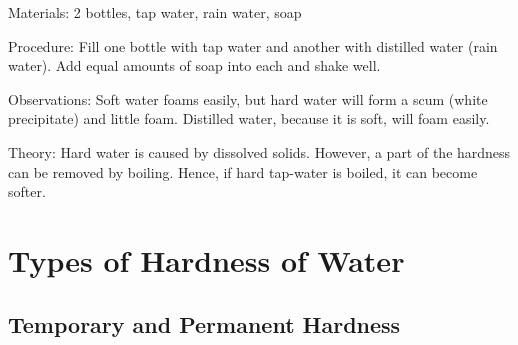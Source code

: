 \begin{multicols}{2}
\begin{description*}
\item[Materials:]{2 bottles, tap water, rain water, soap}
\item[Procedure:]{Fill one bottle with tap water and another with distilled water (rain water). Add equal amounts of soap into each and shake well. }
\item[Observations:]{Soft water foams easily, but hard
water will form a scum (white precipitate) and
little foam. Distilled water, because it is soft,
will foam easily.}
\item[Theory:]{Hard water is caused by dissolved solids.
However, a part of the hardness can be removed
by boiling. Hence, if hard tap-water is boiled, it
can become softer.}
\end{description*}

\vfill
\columnbreak


\section*{Types of Hardness of Water}


\subsection{Temporary and Permanent Hardness}



\end{multicols}
